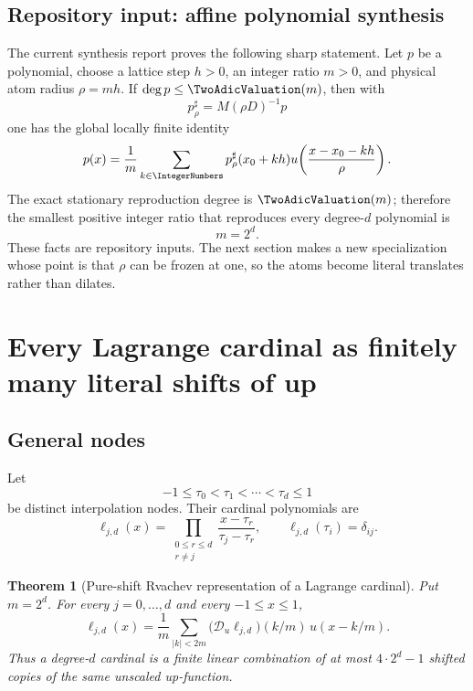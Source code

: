 \documentclass[11pt,oneside]{article}
\numberwithin{equation}{section}
\newtheorem{theorem}{Theorem}[section]
\theoremstyle{definition}
\theoremstyle{remark}
\newcommand{\calD}{\mathscr D_u}
\begin{document}
\subsection{Repository input: affine polynomial synthesis}
The current synthesis report proves the following sharp statement.  Let \(p\) be a
polynomial, choose a lattice step \(h>0\), an integer ratio \(m>0\), and physical
atom radius \(\rho=mh\).  If \(\deg p\le\TwoAdicValuation(m)\), then with
\begin{equation}
 p_\rho^\sharp=M(\rho D)^{-1}p
 \label{eq:psharp}
\end{equation}
one has the global locally finite identity
\begin{equation}
 p(x)=\frac1m\sum_{k\in\IntegerNumbers}
 p_\rho^\sharp(x_0+kh)
 u\!\left(\frac{x-x_0-kh}{\rho}\right).
 \label{eq:repo-synthesis}
\end{equation}
The exact stationary reproduction degree is \(\TwoAdicValuation(m)\); therefore the smallest
positive integer ratio that reproduces every degree-\(d\) polynomial is
\begin{equation}
 m=2^d.
 \label{eq:minimal-m}
\end{equation}
These facts are repository inputs.  The next section makes a new specialization
whose point is that \(\rho\) can be frozen at one, so the atoms become literal
translates rather than dilates.

\section{Every Lagrange cardinal as finitely many literal shifts of up}
\label{sec:cardinal}

\subsection{General nodes}
Let
\begin{equation}
 -1\le\tau_0<\tau_1<\cdots<\tau_d\le1
 \label{eq:nodes}
\end{equation}
be distinct interpolation nodes.  Their cardinal polynomials are
\begin{equation}
 \ell_{j,d}(x)=\prod_{\substack{0\le r\le d\\r\ne j}}
 \frac{x-\tau_r}{\tau_j-\tau_r},
 \qquad
 \ell_{j,d}(\tau_i)=\delta_{ij}.
 \label{eq:cardinal}
\end{equation}

\begin{theorem}[Pure-shift Rvachev representation of a Lagrange cardinal]
\label{thm:pure-shift}
Put \(m=2^d\).  For every \(j=0,\ldots,d\) and every
\(-1\le x\le1\),
\begin{equation}
 \boxed{
 \ell_{j,d}(x)=\frac1m\sum_{|k|<2m}
 \bigl(\calD\ell_{j,d}\bigr)(k/m)\,u(x-k/m).}
 \label{eq:pure-shift}
\end{equation}
Thus a degree-\(d\) cardinal is a finite linear combination of at most
\(4\cdot2^d-1\) shifted copies of the \emph{same unscaled} up-function.
\end{theorem}
\end{document}
